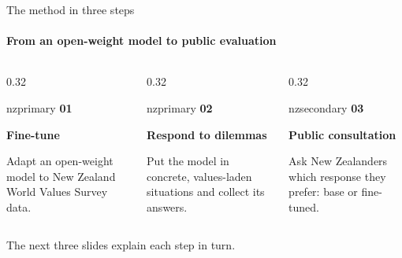 \documentclass[aspectratio=169,11pt,t]{beamer}
\begin{document}
\begin{frame}{The method in three steps}
  \framesubtitle{From an open-weight model to public evaluation}
  \begin{columns}[T,onlytextwidth]
    \begin{column}{0.32\textwidth}
      \begin{nzcard}[equal height group=steps]{nzprimary}
        {\sffamily\bfseries\fontsize{8}{9}\selectfont\color{nzsecondary}01}\par
        \vspace{1mm}
        {\bfseries\small Fine-tune}\par\vspace{1mm}
        {\footnotesize\color{nzmuted}Adapt an open-weight model to New Zealand
         World Values Survey data.}
      \end{nzcard}
    \end{column}
    \hfill
    \begin{column}{0.32\textwidth}
      \begin{nzcard}[equal height group=steps]{nzprimary}
        {\sffamily\bfseries\fontsize{8}{9}\selectfont\color{nzsecondary}02}\par
        \vspace{1mm}
        {\bfseries\small Respond to dilemmas}\par\vspace{1mm}
        {\footnotesize\color{nzmuted}Put the model in concrete,
         values-laden situations and collect its answers.}
      \end{nzcard}
    \end{column}
    \hfill
    \begin{column}{0.32\textwidth}
      \begin{nzcard}[equal height group=steps]{nzsecondary}
        {\sffamily\bfseries\fontsize{8}{9}\selectfont\color{nzsecondary}03}\par
        \vspace{1mm}
        {\bfseries\small Public consultation}\par\vspace{1mm}
        {\footnotesize\color{nzmuted}Ask New Zealanders which response they
         prefer: base or fine-tuned.}
      \end{nzcard}
    \end{column}
  \end{columns}
  \vspace{3mm}
  {\footnotesize\color{nzmuted}The next three slides explain each step in
   turn.}
\end{frame}
\end{document}
